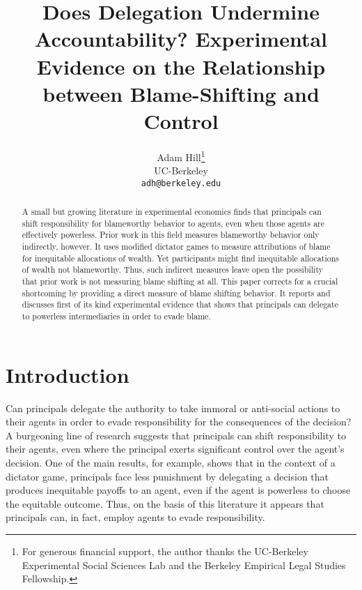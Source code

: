 \documentclass{article}
\begin{document}
\title{Does Delegation Undermine Accountability? Experimental Evidence on the Relationship between Blame-Shifting and Control}

\author{Adam Hill\thanks{For generous financial support, the author thanks the UC-Berkeley Experimental Social Sciences Lab and the Berkeley Empirical Legal Studies Fellowship.}\\
UC-Berkeley\\
 \texttt{adh@berkeley.edu}
}

\maketitle

\newpage

\begin{abstract}

A small but growing literature in experimental economics finds that principals can shift responsibility for blameworthy behavior to agents, even when those agents are effectively powerless. Prior work in this field measures blameworthy behavior only indirectly, however. It uses modified dictator games to measure attributions of blame for inequitable allocations of wealth. Yet participants might find inequitable allocations of wealth not blameworthy. Thus, such indirect measures leave open the possibility that prior work is not measuring blame shifting at all. This paper corrects for a crucial shortcoming by providing a direct measure of blame shifting behavior. It reports and discusses first of its kind experimental evidence that shows that principals can delegate to powerless intermediaries in order to evade blame. 

\end{abstract}

\newpage

\section{Introduction}

Can principals delegate the authority to take immoral or anti-social actions to their agents in order to evade responsibility for the consequences of the decision? A burgeoning line of research suggests that principals can shift responsibility to their agents, even where the principal exerts significant control over the agent's decision.\citep{Hamman2010, Coffman2011, Bartling2012} One of the main results, for example, shows that in the context of a dictator game, principals face less punishment by delegating a decision that produces inequitable payoffs to an agent, even if the agent is powerless to choose the equitable outcome. \citep{Grossman2011} Thus, on the basis of this literature it appears that principals can, in fact, employ agents to evade responsibility. 
\end{document}
